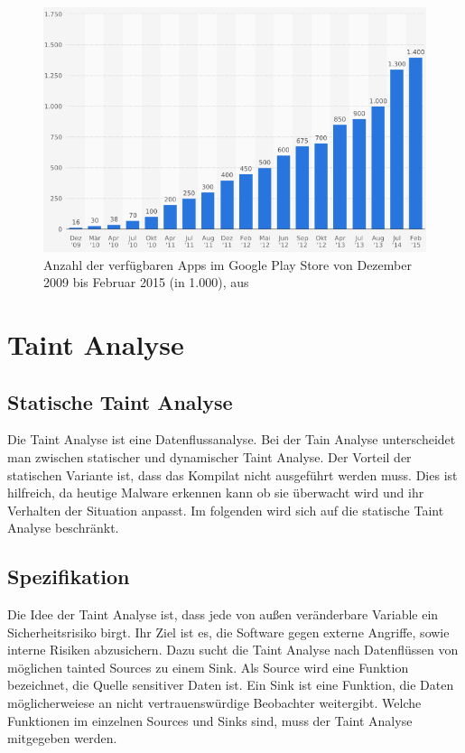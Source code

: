 \documentclass[runningheads]{llncs}
\begin{document}
\begin{figure}[htp]
\centering
\includegraphics[scale=0.60]{img/playstore.png}
\caption{Anzahl der verfügbaren Apps im Google Play Store von Dezember 2009 bis Februar 2015 (in 1.000), aus \cite{playstore}}
\label{fig:playstore}
\end{figure} 

\section{Taint Analyse}
\subsection{Statische Taint Analyse}
Die Taint Analyse ist eine Datenflussanalyse. Bei der Tain Analyse unterscheidet man zwischen statischer und dynamischer Taint Analyse. Der Vorteil der statischen Variante ist, dass das Kompilat nicht ausgeführt werden muss. Dies ist hilfreich, da heutige Malware erkennen kann ob sie überwacht wird und  ihr Verhalten der Situation anpasst. Im folgenden wird sich auf die statische Taint Analyse beschränkt.
\subsection{Spezifikation }
Die Idee der Taint Analyse ist, dass jede von außen veränderbare Variable ein Sicherheitsrisiko birgt. Ihr Ziel ist es, die Software gegen externe Angriffe, sowie interne Risiken abzusichern. Dazu sucht die Taint Analyse nach Datenflüssen von möglichen tainted Sources zu einem Sink. Als Source wird eine Funktion bezeichnet, die Quelle sensitiver Daten ist. Ein Sink ist eine Funktion, die Daten möglicherweiese an nicht vertrauenswürdige Beobachter weitergibt. Welche Funktionen im einzelnen Sources und Sinks sind, muss der Taint Analyse mitgegeben werden.
\end{document}
